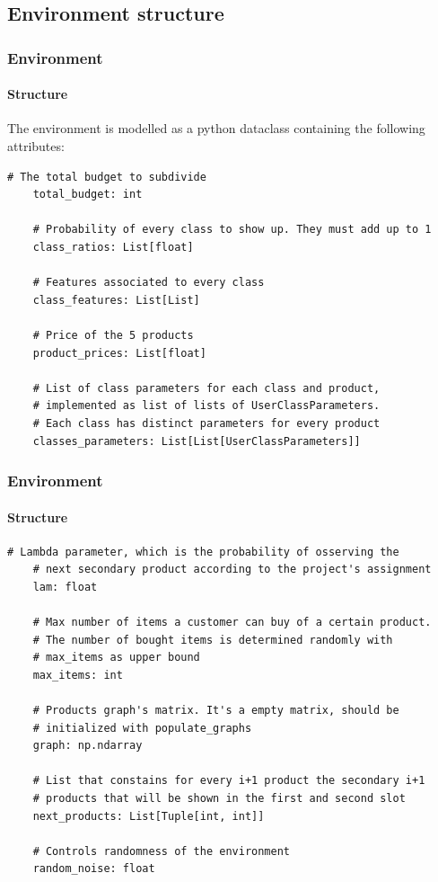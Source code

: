 
\subsection{Environment structure}


\begin{frame}[fragile]

\frametitle{Environment}
\framesubtitle{Structure}

The environment is modelled as a python dataclass containing the following attributes:

\begin{lstlisting}[style=Python, basicstyle=\tiny, numbers=none, framexrightmargin=-20pt]
    # The total budget to subdivide
    total_budget: int

    # Probability of every class to show up. They must add up to 1
    class_ratios: List[float]

    # Features associated to every class
    class_features: List[List]

    # Price of the 5 products
    product_prices: List[float]

    # List of class parameters for each class and product,
    # implemented as list of lists of UserClassParameters.
    # Each class has distinct parameters for every product
    classes_parameters: List[List[UserClassParameters]]
\end{lstlisting}

\end{frame}


\begin{frame}[fragile]

\frametitle{Environment}
\framesubtitle{Structure}

\begin{lstlisting}[style=Python, basicstyle=\tiny, numbers=none, framexrightmargin=-20pt]
    # Lambda parameter, which is the probability of osserving the
    # next secondary product according to the project's assignment
    lam: float

    # Max number of items a customer can buy of a certain product.
    # The number of bought items is determined randomly with
    # max_items as upper bound
    max_items: int

    # Products graph's matrix. It's a empty matrix, should be
    # initialized with populate_graphs
    graph: np.ndarray

    # List that constains for every i+1 product the secondary i+1
    # products that will be shown in the first and second slot
    next_products: List[Tuple[int, int]]

    # Controls randomness of the environment
    random_noise: float
\end{lstlisting}

\end{frame}

